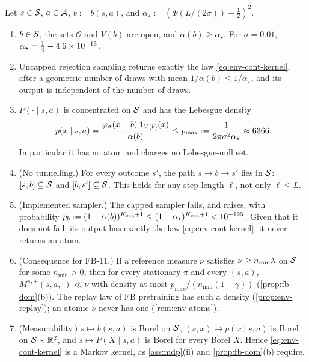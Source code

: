 \begin{proposition}\label{prop:env-cont}
Let $s\in\cS$, $a\in\cA$, $b:=b(s,a)$, and $\alpha_\star:=(\Phi(L/(2\sigma))-\frac12)^2$.
\begin{enumerate}[nosep,label=(\alph*)]
\item $b\in\cS$, the sets $\mathcal O$ and $V(b)$ are open, and $\alpha(b)\ge\alpha_\star$. For $\sigma=0.01$, $\alpha_\star=\frac14-\vn{const.alpha_gap}{4.6\times10^{-13}}$.
\item Uncapped rejection sampling returns exactly the law \eqref{eq:env-cont-kernel}, after a geometric number of draws with mean $1/\alpha(b)\le1/\alpha_\star$, and its output is independent of the number of draws.
\item $P(\cdot\mid s,a)$ is concentrated on $\cS$ and has the Lebesgue density
  \[
  p(x\mid s,a)=\frac{\varphi_\sigma(x-b)\,\ind_{V(b)}(x)}{\alpha(b)}\le p_{\max}:=\frac1{2\pi\sigma^2\alpha_\star}\approx\vn{const.p_max}{6366} .
  \]
  In particular it has no atom and charges no Lebesgue-null set.
\item (No tunnelling.) For every outcome $s'$, the path $s\to b\to s'$ lies in $\cS$: $[s,b]\subseteq\cS$ and $[b,s']\subseteq\cS$. This holds for any step length $\ell$, not only $\ell\le L$.
\item (Implemented sampler.) The capped sampler fails, and raises, with probability $p_b:=(1-\alpha(b))^{K_{\mathrm{cap}}+1}\le(1-\alpha_\star)^{K_{\mathrm{cap}}+1}<\vn{const.cap_lt}{10^{-125}}$. Given that it does not fail, its output has exactly the law \eqref{eq:env-cont-kernel}; it never returns an atom.
\item (Consequence for FB-11.) If a reference measure $\nu$ satisfies $\nu\ge n_{\min}\Leb$ on $\cS$ for some $n_{\min}>0$, then for every stationary $\pi$ and every $(s,a)$, $M^{\pi,+}(s,a,\cdot)\ll\nu$ with density at most $p_{\max}/(n_{\min}(1-\gamma))$ (\cref{prop:fb-dom}(b)). The replay law of FB pretraining has such a density (\cref{prop:env-replay}); an atomic $\nu$ never has one (\cref{rem:env-atoms}).
\item (Measurability.) $s\mapsto b(s,a)$ is Borel on $\cS$, $(s,x)\mapsto p(x\mid s,a)$ is Borel on $\cS\times\R^2$, and $s\mapsto P(X\mid s,a)$ is Borel for every Borel $X$. Hence \eqref{eq:env-cont-kernel} is a Markov kernel, as \cref{ass:mdp}(ii) and \cref{prop:fb-dom}(b) require.
\end{enumerate}
\end{proposition}
